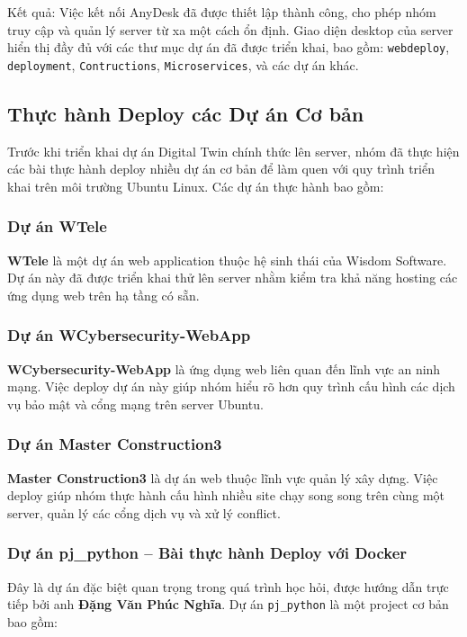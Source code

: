 \documentclass[twocolumn]{article}
\begin{document}
Kết quả: Việc kết nối AnyDesk đã được thiết lập thành công, cho phép nhóm truy cập và quản lý server từ xa một cách ổn định. Giao diện desktop của server hiển thị đầy đủ với các thư mục dự án đã được triển khai, bao gồm: \texttt{webdeploy}, \texttt{deployment}, \texttt{Contructions}, \texttt{Microservices}, và các dự án khác.

\subsection{Thực hành Deploy các Dự án Cơ bản}
Trước khi triển khai dự án Digital Twin chính thức lên server, nhóm đã thực hiện các bài thực hành deploy nhiều dự án cơ bản để làm quen với quy trình triển khai trên môi trường Ubuntu Linux. Các dự án thực hành bao gồm:

\subsubsection{Dự án WTele}
\textbf{WTele} là một dự án web application thuộc hệ sinh thái của Wisdom Software. Dự án này đã được triển khai thử lên server nhằm kiểm tra khả năng hosting các ứng dụng web trên hạ tầng có sẵn.

\subsubsection{Dự án WCybersecurity-WebApp}
\textbf{WCybersecurity-WebApp} là ứng dụng web liên quan đến lĩnh vực an ninh mạng. Việc deploy dự án này giúp nhóm hiểu rõ hơn quy trình cấu hình các dịch vụ bảo mật và cổng mạng trên server Ubuntu.

\subsubsection{Dự án Master Construction3}
\textbf{Master Construction3} là dự án web thuộc lĩnh vực quản lý xây dựng. Việc deploy giúp nhóm thực hành cấu hình nhiều site chạy song song trên cùng một server, quản lý các cổng dịch vụ và xử lý conflict.

\subsubsection{Dự án pj\_python -- Bài thực hành Deploy với Docker}
Đây là dự án đặc biệt quan trọng trong quá trình học hỏi, được hướng dẫn trực tiếp bởi anh \textbf{Đặng Văn Phúc Nghĩa}. Dự án \texttt{pj\_python} là một project cơ bản bao gồm:
\end{document}
